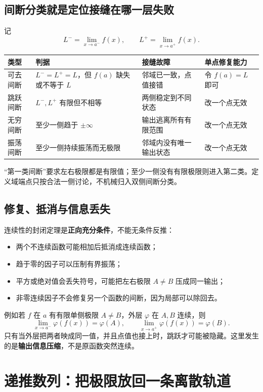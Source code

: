 \documentclass[11pt,a4paper]{ctexart}
\newcommand{\kw}[1]{\textbf{\color{deep}#1}}
\begin{document}
\subsection{间断分类就是定位接缝在哪一层失败}

记
\[
L^- = \lim_{x\to a^-}f(x),\qquad
L^+ = \lim_{x\to a^+}f(x).
\]

\begin{tabularx}{\linewidth}{L{2.2cm}L{4.1cm}YY}
\toprule
\textbf{类型} & \textbf{判据} & \textbf{接缝故障} & \textbf{单点修复能力}\\
\midrule
可去间断 & $L^-=L^+=L$，但 $f(a)$ 缺失或不等于 $L$ & 邻域已一致，点值接错 & 令 $f(a)=L$ 即可\\
跳跃间断 & $L^-,L^+$ 有限但不相等 & 两侧稳定到不同状态 & 改一个点无效\\
无穷间断 & 至少一侧趋于 $\pm\infty$ & 输出逃离所有有限范围 & 改一个点无效\\
振荡间断 & 至少一侧持续振荡而无极限 & 邻域内没有唯一输出状态 & 改一个点无效\\
\bottomrule
\end{tabularx}

“第一类间断”要求左右极限都是有限值；至少一侧没有有限极限则进入第二类。定义域端点只按合法一侧讨论，不机械归入双侧间断分类。

\subsection{修复、抵消与信息丢失}

连续性的封闭定理是\kw{正向充分条件}，不能无条件反推：
\begin{itemize}
  \item 两个不连续函数可能相加后抵消成连续函数；
  \item 趋于零的因子可以压制有界振荡；
  \item 平方或绝对值会丢失符号，可能把左右极限 $A\ne B$ 压成同一输出；
  \item 非零连续因子不会修复另一个函数的间断，因为局部可以除回去。
\end{itemize}

例如若 $f$ 在 $a$ 有有限单侧极限 $A\ne B$，外层 $\varphi$ 在 $A,B$ 连续，则
\[
\lim_{x\to a^-}\varphi(f(x))=\varphi(A),\qquad
\lim_{x\to a^+}\varphi(f(x))=\varphi(B).
\]
只有当外层把两者映成同一值，并且点值也接上时，跳跃才可能被隐藏。这里发生的是\kw{输出信息压缩}，不是原函数突然连续。

\section{递推数列：把极限放回一条离散轨道}
\end{document}
